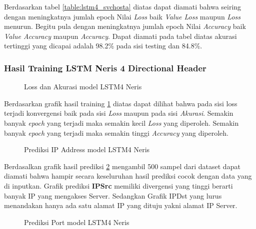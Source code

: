 \documentclass[./skripsi.tex]{subfiles}
\begin{document}
\par Berdasarkan tabel \ref{table:lstm4_svchosta} diatas dapat diamati bahwa seiring dengan meningkatnya jumlah epoch Nilai \textit{Loss} baik \textit{Value Loss} maupun \textit{Loss} menurun. Begitu pula dengan meningkatnya jumlah epoch Nilai \textit{Accuracy} baik \textit{Value Accuracy} maupun \textit{Accuracy}. Dapat diamati pada tabel diatas akurasi tertinggi yang dicapai adalah 98.2\% pada sisi testing dan 84.8\%.

\subsubsection{Hasil Training LSTM Neris 4 Directional Header}
\begin{figure}
    \centering
    \caption{Loss dan Akurasi model LSTM4 Neris}
    \label{fig:lstm4_neris}
\end{figure}

\par Berdasarkan grafik hasil training \ref{fig:lstm4_neris} diatas dapat dilihat bahwa pada sisi loss terjadi konvergensi baik pada sisi \textit{Loss} maupun pada sisi \textit{Akurasi}. Semakin banyak \textit{epoch} yang terjadi maka semakin kecil \textit{Loss} yang diperoleh. Semakin banyak \textit{epoch} yang terjadi maka semakin tinggi \textit{Accuracy} yang diperoleh.

\begin{figure}
    \centering
    \caption{Prediksi IP Address model LSTM4 Neris}
    \label{fig:lstm4_neris_pred1}
\end{figure}

\par Berdasalkan grafik hasil prediksi \ref{fig:lstm4_neris_pred1} mengambil 500 sampel dari dataset dapat diamati bahwa hampir secara keseluruhan hasil prediksi cocok dengan data yang di inputkan. Grafik prediksi \textbf{IPSrc} memiliki divergensi yang tinggi berarti banyak IP yang mengakses Server. Sedangkan Grafik IPDst yang lurus menandakan hanya ada satu alamat IP yang dituju yakni alamat IP Server.

\begin{figure}
    \centering
    \caption{Prediksi Port model LSTM4 Neris}
    \label{fig:lstm4_neris_pred2}
\end{figure}
\end{document}
